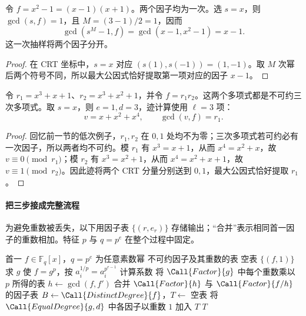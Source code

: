 \documentclass[lang=cn,a4paper,fontset=none,zihao=false,10pt,openany,twoside]{beautybook}
\numberwithin{algorithm}{chapter}
\begin{document}
\begin{example}
令 $f=x^2-1=(x-1)(x+1)$。两个因子均为一次。选 $s=x$，则 $\gcd(s,f)=1$，且 $M=(3-1)/2=1$，因而
\[
 \gcd(s^M-1,f)=\gcd(x-1,x^2-1)=x-1.
\]
这一次抽样将两个因子分开。
\end{example}
\begin{proof}
在 CRT 坐标中，$s=x$ 对应 $(s(1),s(-1))=(1,-1)$。取 $M$ 次幂后两个符号不同，所以最大公因式恰好提取第一项对应的因子 $x-1$。
\end{proof}

\begin{example}
令 $r_1=x^3+x+1$、$r_2=x^3+x^2+1$，并令 $f=r_1r_2$。这两个多项式都是不可约三次多项式。取 $s=x$，则 $e=1,d=3$，迹计算使用 $\ell=3$ 项：
\[
 v=x+x^2+x^4,
 \qquad \gcd(v,f)=r_1.
\]
\end{example}
\begin{proof}
回忆前一节的低次例子，$r_1,r_2$ 在 $0,1$ 处均不为零；三次多项式若可约必有一次因子，所以两者均不可约。模 $r_1$ 有 $x^3=x+1$，从而 $x^4=x^2+x$，故 $v\equiv0\pmod{r_1}$；模 $r_2$ 有 $x^3=x^2+1$，从而 $x^4=x^2+x+1$，故 $v\equiv1\pmod{r_2}$。因此迹将两个 CRT 分量分别送到 $0,1$，最大公因式恰好提取 $r_1$。
\end{proof}

\paragraph{把三步接成完整流程}
为避免重数被丢失，以下用因子表 $\{(r,e_r)\}$ 存储输出；“合并”表示相同首一因子的重数相加。特征 $p$ 与 $q=p^e$ 在整个过程中固定。
\begin{algorithm}[htbp]
\caption{任意有限域上的完整分解}\label{alg:finite-factor}
\begin{algorithmic}[1]
\Require 首一 $f\in\mathbb F_q[x]$，$q=p^e$ 为任意素数幂
\Ensure 不可约因子及其重数的表
  \State \Return 空表
  \State \Return $\{(f,1)\}$
 \EndIf
  \State 求 $g$ 使 $f=g^p$，按 $a_i^{1/p}=a_i^{p^{e-1}}$ 计算系数
  \State \Return 将 $\Call{Factor}{g}$ 中每个重数乘以 $p$ 所得的表
 \EndIf
 \State $h\gets\gcd(f,f')$
  \State \Return 合并 $\Call{Factor}{h}$ 与 $\Call{Factor}{f/h}$ 的因子表
 \EndIf
 \State $B\gets\Call{DistinctDegree}{f}$，$T\gets$ 空表
  \State 将 $\Call{EqualDegree}{g,d}$ 中各因子以重数 $1$ 加入 $T$
 \EndFor
 \State \Return $T$
\EndFunction
\end{algorithmic}
\end{algorithm}
\end{document}
